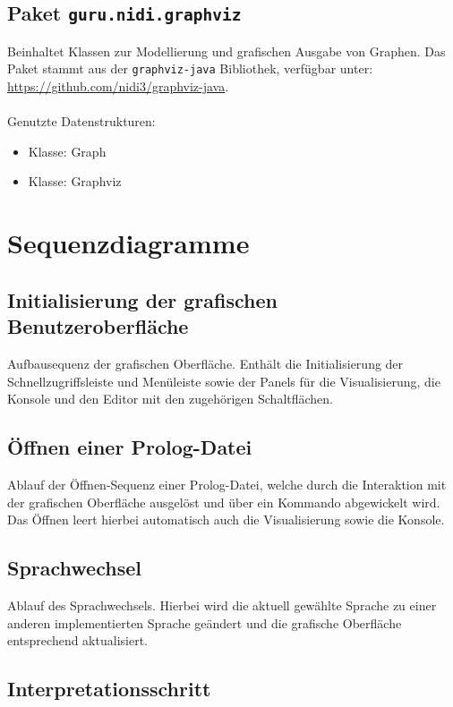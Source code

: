 \documentclass[parskip=full,11pt,twoside]{scrartcl}
\begin{document}
\subsection{Paket \texttt{guru.nidi.graphviz}}

Beinhaltet Klassen zur Modellierung und grafischen Ausgabe von Graphen. Das Paket stammt aus der \texttt{graphviz-java} Bibliothek, verfügbar unter:\\ \url{https://github.com/nidi3/graphviz-java}.\\\\Genutzte Datenstrukturen:
\begin{itemize}
	\item Klasse: Graph
	\item Klasse: Graphviz
\end{itemize}

\section{Sequenzdiagramme}

\subsection{Initialisierung der grafischen Benutzeroberfläche}

Aufbausequenz der grafischen Oberfläche. Enthält die Initialisierung der Schnellzugriffsleiste und Menüleiste sowie der Panels für die Visualisierung, die Konsole und den Editor mit den zugehörigen Schaltflächen.

\subsection{Öffnen einer Prolog-Datei}

Ablauf der Öffnen-Sequenz einer Prolog-Datei, welche durch die Interaktion mit der grafischen Oberfläche ausgelöst und über ein Kommando abgewickelt wird. Das Öffnen leert hierbei automatisch auch die Visualisierung sowie die Konsole.

\subsection{Sprachwechsel}

Ablauf des Sprachwechsels. Hierbei wird die aktuell gewählte Sprache zu einer anderen implementierten Sprache geändert und die grafische Oberfläche entsprechend aktualisiert.

\subsection{Interpretationsschritt}
\end{document}
